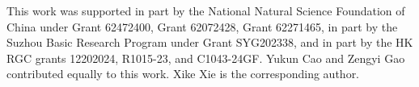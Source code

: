 
\begin{acks}
This work was supported in part by the National Natural Science Foundation of China under Grant 62472400, Grant 62072428, Grant 62271465, in part by the Suzhou Basic Research Program under Grant SYG202338, and in part by the HK RGC grants 12202024, R1015-23, and C1043-24GF. Yukun Cao and Zengyi Gao contributed equally to this work. Xike Xie is the corresponding author.
\label{section: acknowledgements}
\end{acks}